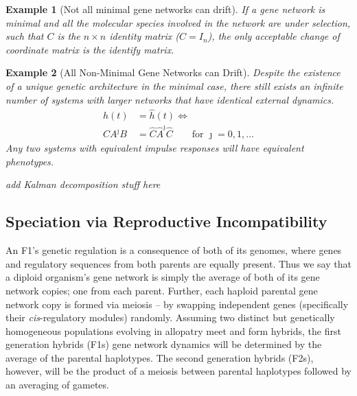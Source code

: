 \documentclass[9 pt]{article}
\newcommand{\plr}[1]{{\color{blue}\it #1}}
\newcommand{\1}{\mathbbm{1}}
\newtheorem{example}{Example}
\begin{document}
  
    \begin{example}[Not all minimal gene networks can drift]
      If a gene network is minimal and all the molecular species involved in the network are under selection, such that $C$ is the $n \times n$ identity matrix  ($C = I_{n}$), the only acceptable  change of coordinate matrix is the identify matrix.
     
      \end{example}
      \begin{example}[All Non-Minimal Gene Networks can Drift]
      
      Despite the existence of a unique genetic architecture in the minimal case, there still exists an infinite number of systems with larger networks that have identical external dynamics. 
      \begin{align}
        h(t) &= \widehat{h}(t) \iff \\ 
        CA^{\jmath}B &= \widehat{C} \widehat{A}^{\jmath} \widehat{C} \qquad \text{for } \jmath = 0, 1, \dots
      \end{align}
      Any two systems with equivalent impulse responses will have equivalent phenotypes.
      \end{example}

      \plr{add Kalman decomposition stuff here}

      \subsection*{Speciation via Reproductive Incompatibility}


     An F1's genetic regulation is a consequence of both of its genomes, where genes and regulatory sequences from both parents are equally present. Thus we say that a diploid organism's gene network is simply the average of both of its gene network copies; one from each parent. Further, each haploid parental gene network copy is formed via meiosis -- by swapping independent genes (specifically their \emph{cis}-regulatory modules) randomly. Assuming two distinct but genetically homogeneous populations evolving in allopatry meet and form hybrids, the first generation hybrids (F1s) gene network dynamics will be determined by the average of the parental haplotypes. The second generation hybrids (F2s), however, will be the product of a meiosis between parental haplotypes followed by an averaging of gametes. 
\end{document}
